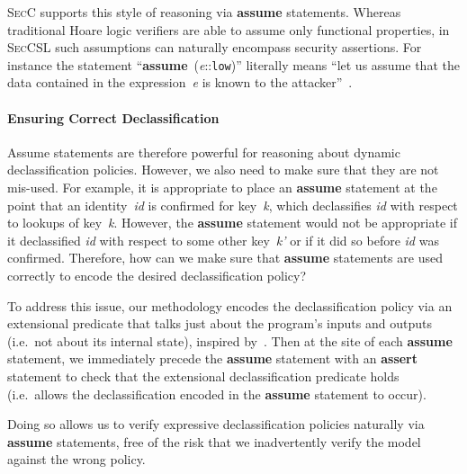 \documentclass{llncs}
\newcommand{\SecCSL}{\textsc{SecCSL}\xspace}
\newcommand{\SecC}{\textsc{SecC}\xspace}
\begin{document}
\SecC supports this style of reasoning via \textbf{assume} statements.
Whereas traditional Hoare logic verifiers are able to assume only
functional properties, in \SecCSL such assumptions can naturally encompass
security assertions. For instance the statement ``\mbox{\textbf{assume} (\emph{e}::\texttt{low})}'' literally means ``let us assume that the data contained
in the expression~\emph{e} is known to the attacker''~\cite{chudnov2018assuming}. 

\paragraph{Ensuring Correct Declassification}

Assume statements are therefore powerful for reasoning about dynamic
declassification policies. However, we also need to make sure that they
are not mis-used. For example, it is appropriate to place
an \textbf{assume} statement at the
point that an identity~\emph{id} is confirmed for key~\emph{k}, which
declassifies \emph{id} with respect to lookups of key~\emph{k}. However,
the \textbf{assume} statement would not be appropriate if it declassified
\emph{id} with respect to some other key~\emph{k'} or if it did so before
\emph{id} was confirmed. 
Therefore, how can we make sure that
\textbf{assume} statements are used correctly to encode the desired
declassification policy?

To address this issue, our methodology encodes the declassification policy via an
extensional predicate that talks just about the program's inputs and outputs
(i.e.\ not about its internal state), inspired by~\cite{Schoepe_MS_20}.
Then at the site of each \textbf{assume} statement, we immediately
precede the \textbf{assume} statement with an \textbf{assert} statement
to check
that the extensional declassification predicate holds (i.e.\ allows the
declassification encoded in the \textbf{assume} statement to occur).

Doing so allows us to verify expressive declassification policies
naturally via \textbf{assume} statements, free of the risk that we
inadvertently verify the model against the wrong policy.




\end{document}
